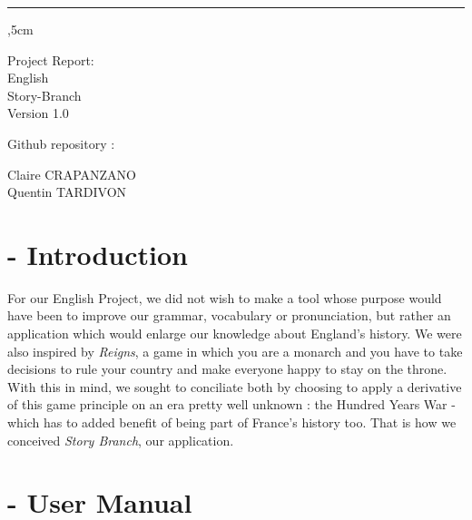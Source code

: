 \documentclass{scrreprt}
\date{}
\def\myversion{1.0}
\begin{document}
%
\thispagestyle{empty}
\begin{flushright}
    \rule{15cm}{3pt},5cm
    \begin{bfseries}
        \Huge{Project Report: \\ English}\\
        \vspace{2cm}
        \vspace{2cm}
        \Huge{Story-Branch}\\

        \vspace{0.5cm}
        \LARGE{Version \myversion}\\
        \begin{flushleft}
            \vspace{8cm}
            Github repository : \href{https://github.com/quentin-tardivon/Story-Branch}{\faGithub}~\\
            \vspace{0.5cm}

            Claire CRAPANZANO\\
            Quentin TARDIVON\\
        \end{flushleft}
    \end{bfseries}
\end{flushright}

\tableofcontents

\setcounter{page}{0}

\chapter{- Introduction}

For our English Project, we did not wish to make a tool whose purpose would have been to improve our grammar, vocabulary or pronunciation, but rather an application which would enlarge our knowledge about England's history. We were also inspired by \textit{Reigns}, a game in which you are a monarch and you have to take decisions to rule your country and make everyone happy to stay on the throne.
With this in mind, we sought to conciliate both by choosing to apply a derivative of this game principle on an era pretty well unknown : the Hundred Years War - which has to added benefit of being part of France's history too. That is how we conceived \textit{Story Branch}, our application.

{\let\clearpage\relax \chapter{- User Manual}}
\end{document}
